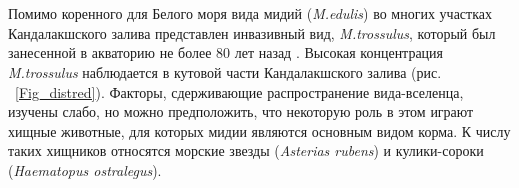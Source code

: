 \documentclass[a0,portrait]{a0poster}
\begin{document}
\begin{minipage}[t]{0.5\linewidth}		
		
% 			
% 			
% 		




		\color{Black} %



\section*{}




		
%
\begin{minipage}[t]{0.4\linewidth}

Помимо коренного для Белого моря вида мидий (\emph{M.edulis}) во многих участках  Кандалакшского залива представлен инвазивный вид, \emph{M.trossulus}, который был занесенной в акваторию не более 80 лет назад \citep{vainola_mytilus_2011}. Высокая концентрация \emph{M.trossulus} наблюдается в кутовой части Кандалакшского залива (рис. ~\ref{Fig_distred}). Факторы, сдерживающие распространение  вида-вселенца, изучены слабо, но можно предположить, что некоторую роль в этом играют хищные животные, для которых мидии являются основным видом корма. К числу таких хищников относятся морские звезды (\emph{Asterias rubens}) и кулики-сороки (\emph{Haematopus  ostralegus}). 


\end{minipage}
\end{minipage}
\end{document}
